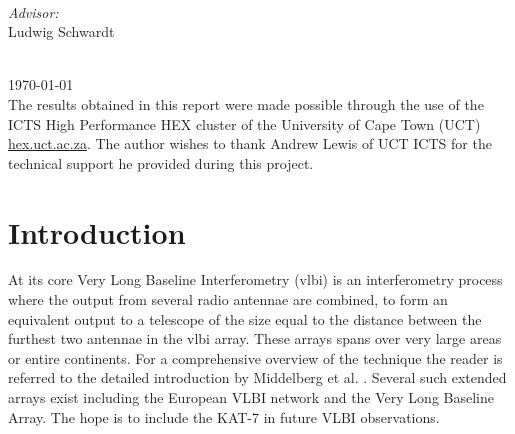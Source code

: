 \documentclass[a4paper,10pt]{article}
\begin{document}
\begin{titlepage}
\begin{minipage}{0.4\textwidth}
\begin{flushleft}
\end{flushleft}
\end{minipage}
~
\begin{minipage}{0.4\textwidth}
\begin{flushright} \large
\emph{Advisor:} \\
Ludwig Schwardt
\end{flushright}
\end{minipage}\\[3cm]



{\large \today}\\[2.5cm] %
{The results obtained in this report were made possible through the use of the ICTS High Performance HEX cluster 
of the University of Cape Town (UCT) \url{hex.uct.ac.za}. The author wishes to thank Andrew Lewis of UCT ICTS for 
the technical support he provided during this project.}


\vfill %

\end{titlepage}

\printglossary[style=long]
\pagebreak
\tableofcontents
\pagebreak
\listoffigures
\listoftables
\pagebreak
\section{Introduction}
At its core Very Long Baseline Interferometry (\gls{vlbi}) is an interferometry process where the output from several radio antennae are 
combined, to form an equivalent output to a telescope of the size equal to the distance between the furthest two antennae in the \gls{vlbi} array. These
arrays spans over very large areas or entire continents. For a comprehensive overview of the technique the reader is referred to the detailed introduction 
by Middelberg et al. \cite{middelberg2008high}. Several such extended arrays exist including the European VLBI network and the Very Long Baseline Array. The 
hope is to include the KAT-7 in future VLBI observations.
\end{document}

